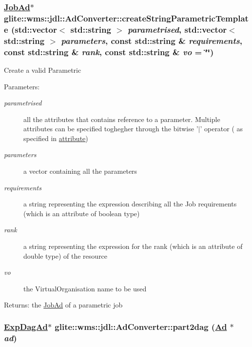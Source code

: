 \hypertarget{classglite_1_1wms_1_1jdl_1_1AdConverter_z21_1}{
\subsubsection[createStringParametricTemplate]{\setlength{\rightskip}{0pt plus 5cm}\hyperlink{classglite_1_1wms_1_1jdl_1_1JobAd}{Job\-Ad}$\ast$ glite::wms::jdl::Ad\-Converter::create\-String\-Parametric\-Template (std::vector$<$ std::string $>$ {\em parametrised}, std::vector$<$ std::string $>$ {\em parameters}, const std::string \& {\em requirements}, const std::string \& {\em rank}, const std::string \& {\em vo} = \char`\"{}\char`\"{})}}
\label{classglite_1_1wms_1_1jdl_1_1AdConverter_z21_1}


Create a valid Parametric \begin{Desc}
\item[Parameters:]
\begin{description}
\item[{\em parametrised}]all the attributes that contains reference to a parameter. Multiple attributes can be specified toghegher through the bitwise '$|$' operator ( as specified in \hyperlink{classglite_1_1wms_1_1jdl_1_1AdConverter_w10}{attribute}) \item[{\em parameters}]a vector containing all the parameters \item[{\em requirements}]a string representing the expression describing all the Job requirements (which is an attribute of boolean type) \item[{\em rank}]a string representing the expression for the rank (which is an attribute of double type) of the resource \item[{\em vo}]the Virtual\-Organisation name to be used \end{description}
\end{Desc}
\begin{Desc}
\item[Returns:]the \hyperlink{classglite_1_1wms_1_1jdl_1_1JobAd}{Job\-Ad} of a parametric job\end{Desc}
\hypertarget{classglite_1_1wms_1_1jdl_1_1AdConverter_z23_1}{
\subsubsection[part2dag]{\setlength{\rightskip}{0pt plus 5cm}\hyperlink{classglite_1_1wms_1_1jdl_1_1ExpDagAd}{Exp\-Dag\-Ad}$\ast$ glite::wms::jdl::Ad\-Converter::part2dag (\hyperlink{classglite_1_1wms_1_1jdl_1_1Ad}{Ad} $\ast$ {\em ad})}}
\label{classglite_1_1wms_1_1jdl_1_1AdConverter_z23_1}


